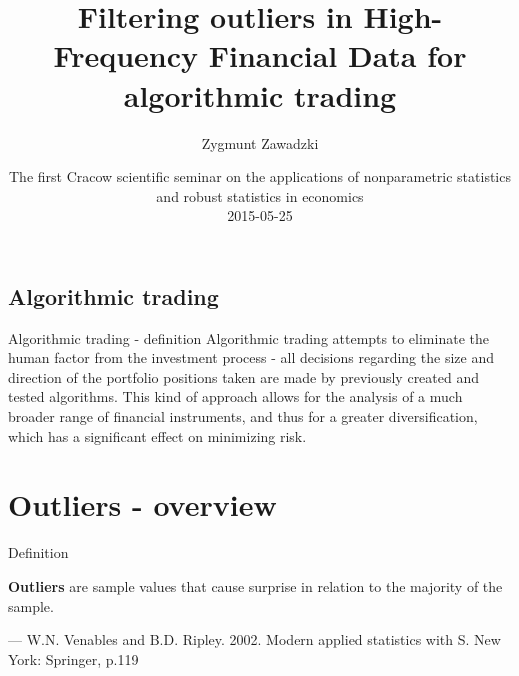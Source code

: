 \documentclass{beamer}
\begin{document}
\newcommand{\Spt}{\ensuremath{Sp_{t}}}

\newcommand{\MSpc}{\ensuremath{Sp_{t|t-1}}}
\newcommand{\MSpn}{\ensuremath{Sp_{t+1|t}}}
\newcommand{\MSpo}{\ensuremath{Sp_{t-1|t-1}}}

\newcommand{\ts}{\ensuremath{{t}} }
\newcommand{\tsl}{\ensuremath{{t-1}} }


\author{Zygmunt Zawadzki}

\title{Filtering outliers in High-Frequency Financial Data for algorithmic trading}

\begin{frame}
\date{The first Cracow scientific seminar on the applications of nonparametric statistics and robust statistics in economics \\ 2015-05-25}
  \titlepage
\end{frame}

\begin{frame}
\tableofcontents
\end{frame}

\begin{frame}

\section{Algorithmic trading}
\begin{block}{Algorithmic trading - definition}
Algorithmic trading attempts to eliminate the human factor from the investment process - all decisions regarding the size and direction of the portfolio positions taken are made by previously created and tested algorithms. This kind of approach allows for the analysis of a much broader range of financial instruments, and thus for a greater diversification, which has a significant effect on minimizing risk.
\end{block}

\end{frame}

\section{Outliers - overview}

\begin{frame}{Definition}

\begin{block}{}
\Large
\textbf{Outliers} are sample values that cause surprise in relation to the majority of the sample.
\vskip3mm

\hspace{50pt}\normalsize{--- W.N. Venables and B.D. Ripley. 2002. Modern applied statistics with S. New York: Springer, p.119}
\end{block}

\end{frame}
\end{document}
